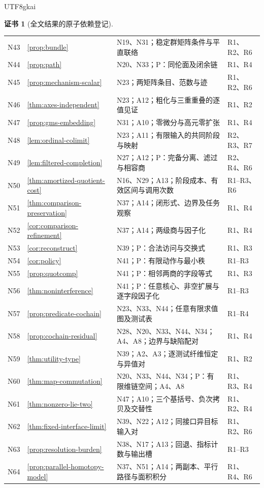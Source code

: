 \documentclass[12pt]{report}
\theoremstyle{definition}
\newtheorem{Certificate}{证书}[chapter]
\begin{document}
\begin{CJK*}{UTF8}{gkai}
\begin{Certificate}[全文结果的原子依赖登记]
\begin{longtable}{p{}p{}p{}p{}}
N43 & \ref{prop:bundle} & N19、N31；稳定群矩阵条件与平直联络 & R1、R2、R6\\
N44 & \ref{prop:path} & N20、N33；P：同伦面及闭余链 & R1、R4\\
N45 & \ref{prop:mechanism-scalar} & N23；两矩阵条目、范数与迹 & R1、R2、R6\\
N46 & \ref{thm:axes-independent} & N23；A12；粗化与三重重叠的逐值见证 & R1、R2\\
N47 & \ref{prop:gms-embedding} & N31；A10；零微分与高元零扩张 & R1、R4\\
N48 & \ref{lem:ordinal-colimit} & N23；A11；有限输入的共同阶段与映射 & R2、R3、R7\\
N49 & \ref{lem:filtered-completion} & N27；A12；P：完备分离、滤过与相容商 & R2、R4、R6\\
N50 & \ref{thm:amortized-quotient-cost} & N16、N29；A13；阶段成本、有效区间与调用次数 & R1--R3、R6\\
N51 & \ref{thm:comparison-preservation} & N37；A14；闭形式、边界及任务观察 & R1、R4\\
N52 & \ref{cor:comparison-refinement} & N37；A14；两级商与因子化 & R1、R4\\
N53 & \ref{cor:reconstruct} & N39；P：合法访问与交换式 & R1、R3\\
N54 & \ref{cor:policy} & N41；P：有限动作与最小秩 & R1--R3\\
N55 & \ref{prop:quotcomp} & N41；P：相邻两商的字段等式 & R1、R3\\
N56 & \ref{thm:noninterference} & N41；P：任意核心、非空扩展与逐字段因子化 & R1--R3\\
N57 & \ref{prop:predicate-cochain} & N23、N33、N44；任意有限求值图及测试表 & R1--R4\\
N58 & \ref{prop:cochain-residual} & N28、N20、N33、N44、N34；A4、A8；边界与缺陷配对 & R1、R4\\
N59 & \ref{thm:utility-type} & N39；A2、A3；逐测试纤维恒定与异值对 & R1、R2\\
N60 & \ref{thm:map-commutation} & N20、N33、N44、N34；P：有限维链空间；A4、A8 & R1、R3、R4\\
N61 & \ref{thm:nonzero-lie-two} & N47；A10；三个基括号、负次拷贝及交替性 & R1、R2、R4\\
N62 & \ref{thm:fixed-interface-limit} & N39、N22；A12；同接口异目标输入对 & R1、R2、R6\\
N63 & \ref{prop:resolution-burden} & N38、N17；A13；回退、指标计数与输出槽 & R1--R3\\
N64 & \ref{prop:parallel-homotopy-model} & N37、N51；A14；两副本、平行路径与面积积分 & R1、R4、R6\\

\end{longtable}
\end{Certificate}
\end{CJK*}
\end{document}

